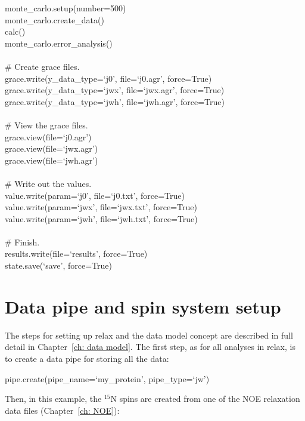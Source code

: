 \begin{exampleenv}
monte\_carlo.setup(number=500) \\
monte\_carlo.create\_data() \\
calc() \\
monte\_carlo.error\_analysis() \\
 \\
\# Create grace files. \\
grace.write(y\_data\_type=`j0', file=`j0.agr', force=True) \\
grace.write(y\_data\_type=`jwx', file=`jwx.agr', force=True) \\
grace.write(y\_data\_type=`jwh', file=`jwh.agr', force=True) \\
 \\
\# View the grace files. \\
grace.view(file=`j0.agr') \\
grace.view(file=`jwx.agr') \\
grace.view(file=`jwh.agr') \\
 \\
\# Write out the values. \\
value.write(param=`j0', file=`j0.txt', force=True) \\
value.write(param=`jwx', file=`jwx.txt', force=True) \\
value.write(param=`jwh', file=`jwh.txt', force=True) \\
 \\
\# Finish. \\
results.write(file=`results', force=True) \\
state.save(`save', force=True)
\end{exampleenv}




\section{Data pipe and spin system setup}

The steps for setting up relax and the data model concept are described in full detail in Chapter~\ref{ch: data model}.  The first step, as for all analyses in relax, is to create a data pipe for storing all the data:

\begin{exampleenv}
pipe.create(pipe\_name=`my\_protein', pipe\_type=`jw')
\end{exampleenv}

Then, in this example, the $^{15}$N spins are created from one of the NOE relaxation data files (Chapter~\ref{ch: NOE}):

